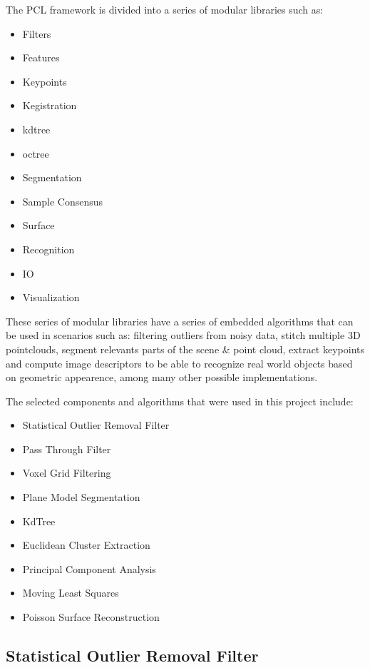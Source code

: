 \documentclass[12pt]{report}
\begin{document}
The PCL framework is divided into a series of modular libraries such as:
\begin{multicols}{2}
\begin{itemize}
  \itemsep0em 
  \item Filters
  \item Features
  \item Keypoints
  \item Kegistration
  \item kdtree
  \item octree
  \item Segmentation
  \item Sample Consensus
  \item Surface
  \item Recognition
  \item IO 
  \item Visualization
\end{itemize}
\end{multicols}

These series of modular libraries  have a series of embedded algorithms  that can be used in scenarios such as: filtering outliers from noisy data, stitch multiple 3D pointclouds,
segment relevants parts of the scene \& point cloud, extract keypoints and compute image descriptors to be able to recognize real world objects based on geometric appearence, among many other possible implementations.

The selected components and algorithms that were used in this project include: 

\begin{itemize}
  \itemsep0em 
  \item Statistical Outlier Removal Filter
  \item Pass Through Filter
  \item Voxel Grid Filtering
  \item Plane Model Segmentation
  \item KdTree
  \item Euclidean Cluster Extraction
  \item Principal Component Analysis
  \item Moving Least Squares
  \item Poisson Surface Reconstruction 
\end{itemize}


\subsection{Statistical Outlier Removal Filter}
\label{section:StatisticalOutlierRemovalFilter}
\end{document}
